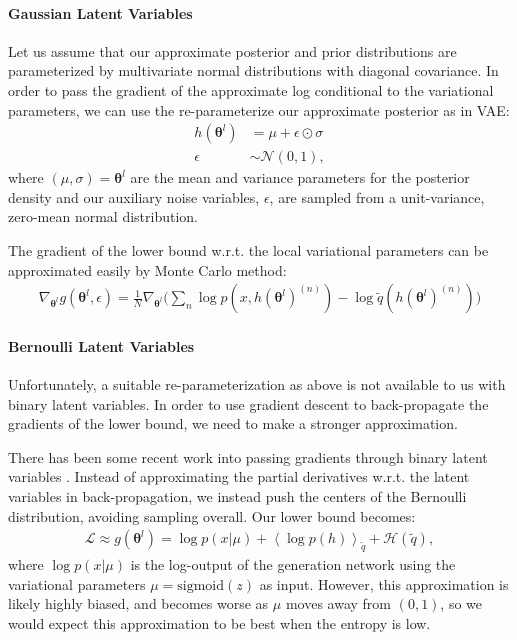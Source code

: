 \documentclass{article} %
\newcommand{\qexp}[1]{\left<#1\right>}
\newcommand{\vects}[1]{\boldsymbol{#1}}
\newcommand{\TT}[0]{\vects{\theta}}
\newcommand{\grad}[0]{\nabla}
\newcommand{\LL}[0]{\mathcal{L}}
\newcommand{\HH}[0]{\mathcal{H}}
\newcommand{\NN}[0]{\mathcal{N}}
\newcommand{\sigmoid}{\text{sigmoid}}
\begin{document}
\paragraph{Gaussian Latent Variables}

Let us assume that our approximate posterior and prior distributions are
parameterized by multivariate normal distributions with diagonal covariance. In
order to pass the gradient of the approximate log conditional to the variational
parameters, we can use the re-parameterize our approximate posterior as in VAE:
\begin{align}
h(\TT^l) &= \mu + \epsilon \odot \sigma \nonumber \\
\epsilon &\sim \NN(0, 1),
\end{align}
where $(\mu, \sigma) = \TT^l$ are the mean and variance parameters for the
posterior density and our auxiliary noise variables, $\epsilon$, are sampled
from a unit-variance, zero-mean normal distribution.

The gradient of the lower bound w.r.t. the local variational parameters can be
approximated easily by Monte Carlo method:
\begin{align}
\grad_{\TT^l} g(\TT^l, \epsilon) = \frac{1}{N} \grad_{\TT^l} \bigg(\sum_n \log p(x, h(\TT^l)^{(n)}) - \log \tilde{q}(h(\TT^l)^{(n)})\bigg)
\end{align}

\paragraph{Bernoulli Latent Variables}
Unfortunately, a suitable re-parameterization as above is not available to us
with binary latent variables. In order to use gradient descent to back-propagate
the gradients of the lower bound, we need to make a stronger approximation. 

There has been some recent work into passing gradients through binary latent
variables \citep{bengio2013estimating}. Instead of approximating the partial
derivatives w.r.t. the latent variables in back-propagation, we instead push the
centers of the Bernoulli distribution, avoiding sampling overall. Our lower
bound becomes:
\begin{align}
     \LL \approx g(\TT^l) = \log p(x | \mu) + \qexp{\log p(h)}_{\tilde{q}} +
     \HH(\tilde{q}),
\end{align}
where $\log p(x | \mu)$ is the log-output of the generation network using the
variational parameters $\mu = \sigmoid(z)$ as input. However, this approximation
is likely highly biased, and becomes worse as $\mu$ moves away from $(0, 1)$, so
we would expect this approximation to be best when the entropy is low.
\end{document}
